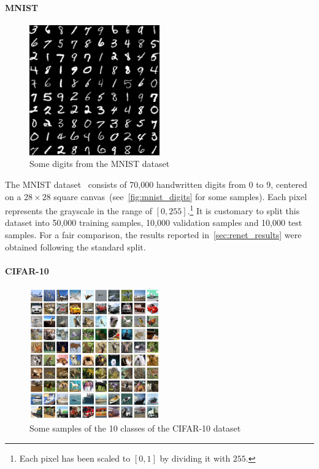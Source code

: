 \paragraph{MNIST}

\begin{figure}[h]
    \centering
    \includegraphics[width=0.5\textwidth]{img/mnist_digits.png}
    \caption{Some digits from the MNIST dataset}
    \label{fig:mnist_digits}
\end{figure}

The MNIST dataset~\citep{Lecun99objectrecognition} consists of 70,000
handwritten digits from 0 to 9, centered on a $28\times 28$ square
canvas~(see~\autoref{fig:mnist_digits} for some samples). Each pixel represents
the grayscale in the range of $\left[0, 255\right]$.\footnote{Each pixel has
been scaled to $[0, 1]$ by dividing it with $255$.} It is customary to split
this dataset into 50,000 training samples, 10,000 validation samples and 10,000
test samples. For a fair comparison, the results reported
in~\autoref{sec:renet_results} were obtained following the standard split.

\paragraph{CIFAR-10}

\begin{figure}[h]
    \centering
    \includegraphics[width=0.5\textwidth]{img/cifar-10.png}
    \caption{Some samples of the 10 classes of the CIFAR-10 dataset}
    \label{fig:cifar}
\end{figure}

